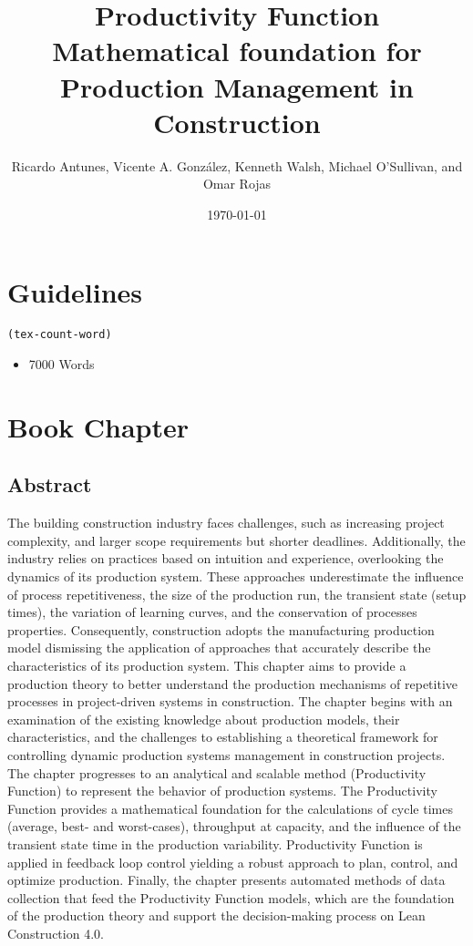 \documentclass{article}
\author{Ricardo Antunes, Vicente A. González, Kenneth Walsh, Michael O'Sullivan, and Omar Rojas}
\date{\today}
\title{Productivity Function\\\medskip
\large Mathematical foundation for Production Management in Construction}
\begin{document}
\maketitle
\tableofcontents



\section{Guidelines}
\label{sec:orgb90e778}
\begin{verbatim}
(tex-count-word)
\end{verbatim}
\begin{itemize}
\item 7000 Words
\end{itemize}
\section{Book Chapter}
\label{sec:org0ec7c21}
\subsection{Abstract}
\label{sec:org0a9505c}
The building construction industry faces challenges, such as increasing project complexity, and larger scope requirements but shorter deadlines. 
Additionally, the industry relies on practices based on intuition and experience, overlooking the dynamics of its production system. 
These approaches underestimate the influence of process repetitiveness, the size of the production run, the transient state (setup times), the variation of learning curves, and the conservation of processes properties. 
Consequently, construction adopts the manufacturing production model dismissing the application of approaches that accurately describe the characteristics of its production system. 
This chapter aims to provide a production theory to better understand the production mechanisms of repetitive processes in project-driven systems in construction.
The chapter begins with an examination of the existing knowledge about production models, their characteristics, and the challenges to establishing a theoretical framework for controlling dynamic production systems management in construction projects. 
The chapter progresses to an analytical and scalable method (Productivity Function) to represent the behavior of production systems. 
The Productivity Function provides a mathematical foundation for the calculations of cycle times (average, best- and worst-cases), throughput at capacity, and the influence of the transient state time in the production variability. 
Productivity Function is applied in feedback loop control yielding a robust approach to plan, control, and optimize production.
Finally, the chapter presents automated methods of data collection that feed the Productivity Function models, which are the foundation of the production theory and support the decision-making process on Lean Construction 4.0. 
\end{document}
